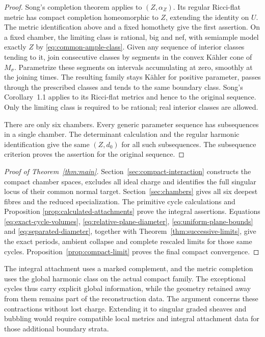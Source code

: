 \begin{proof}
Song's completion theorem
\cite[Theorem~1.1]{song} applies to
$(Z,\alpha_Z)$. Its regular Ricci-flat
metric has compact completion homeomorphic
to $Z$, extending the identity on $U$.
The metric identification above and a fixed
homothety give the first assertion.
On a fixed chamber, the limiting class is rational, big and nef, with
semiample model exactly $Z$ by
\eqref{eq:common-ample-class}.
Given any sequence of interior classes tending to it,
join consecutive classes by segments in the convex K\"ahler
cone of $M_\sigma$. Parametrize these segments on intervals
accumulating at zero, smoothly at the joining times.
The resulting family stays K\"ahler for positive parameter,
passes through the prescribed classes and tends to the same
boundary class. Song's Corollary~1.1 applies to its Ricci-flat
metrics and hence to the original sequence. Only the limiting
class is required to be rational; real interior classes are allowed.

There are only six chambers. Every generic
parameter sequence has subsequences in a
single chamber. The determinant calculation
and the regular harmonic identification
give the same $(Z,d_0)$ for all such
subsequences. The subsequence criterion
proves the assertion for the original
sequence.
\end{proof}

\begin{proof}[Proof of Theorem~\ref{thm:main}]
Section~\ref{sec:compact-interaction} constructs
the compact chamber spaces, excludes all
ideal charge and identifies the full
singular locus of their common normal
target. Section~\ref{sec:chambers} gives
all six deepest fibres and the reduced
specialization. The primitive cycle
calculations and Proposition
\ref{prop:calculated-attachments} prove
the integral assertions. Equations
\eqref{eq:exact-cycle-volumes},
\eqref{eq:relative-plane-diameter},
\eqref{eq:uniform-plane-bounds} and
\eqref{eq:separated-diameter}, together
with Theorem~\ref{thm:successive-limits},
give the exact periods, ambient collapse
and complete rescaled limits for those
same cycles. Proposition~\ref{prop:compact-limit}
proves the final compact convergence.
\end{proof}

The integral attachment uses a marked
complement, and the metric completion uses
the global harmonic class on the actual
compact family. The exceptional cycles
thus carry explicit global information,
while the geometry retained away from
them remains part of the reconstruction
data. The argument concerns these
contractions without lost charge. Extending
it to singular graded sheaves and bubbling
would require compatible local metrics and
integral attachment data for those additional
boundary strata.
